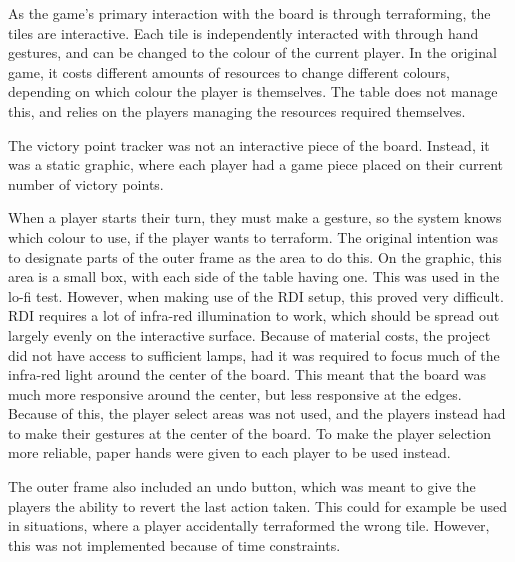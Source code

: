 As the game's primary interaction with the board is through terraforming, the tiles are interactive. Each tile is independently interacted with through hand gestures, and can be changed to the colour of the current player. In the original game, it costs different amounts of resources to change different colours, depending on which colour the player is themselves. The table does not manage this, and relies on the players managing the resources required themselves.

The victory point tracker was not an interactive piece of the board. Instead, it was a static graphic, where each player had a game piece placed on their current number of victory points.

When a player starts their turn, they must make a gesture, so the system knows which colour to use, if the player wants to terraform. The original intention was to designate parts of the outer frame as the area to do this. On the graphic, this area is a small box, with each side of the table having one. This was used in the lo-fi test. However, when making use of the RDI setup, this proved very difficult. RDI requires a lot of infra-red illumination to work, which should be spread out largely evenly on the interactive surface. Because of material costs, the project did not have access to sufficient lamps, had it was required to focus much of the infra-red light around the center of the board. This meant that the board was much more responsive around the center, but less responsive at the edges. Because of this, the player select areas was not used, and the players instead had to make their gestures at the center of the board. To make the player selection more reliable, paper hands were given to each player to be used instead. 

The outer frame also included an undo button, which was meant to give the players the ability to revert the last action taken. This could for example be used in situations, where a player accidentally terraformed the wrong tile. However, this was not implemented because of time constraints.